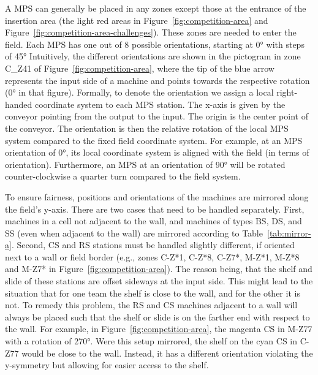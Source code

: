 \documentclass[12pt,twoside]{article}
\newcommand{\reffig}[1]{Figure~\ref{#1}}
\newcommand{\reftab}[1]{Table~\ref{#1}}
\begin{document}
A \ac{MPS} can generally  be placed in any zones except those at the
entrance of the insertion area (the light red areas in
\reffig{fig:competition-area} and \reffig{fig:competition-area-challenges}).
These zones are needed to enter the field. Each \ac{MPS} has one out of 8
possible orientations, starting at \ang{0} with steps of \ang{45}
Intuitively, the different orientations are shown in the pictogram in
zone C\_Z41 of \reffig{fig:competition-area}, where
the tip of the blue arrow represents the input side of a machine and points
towards the respective rotation (\ang{0} in that figure).
Formally, to denote
the orientation  we assign a local right-handed coordinate system to
each \ac{MPS} station. The x-axis is given by the conveyor pointing from
the output to the input. The origin is the center point of the
conveyor. The orientation is then the relative rotation of the local
\ac{MPS} system compared to the fixed field coordinate system. For example,
at an \ac{MPS} orientation of \ang{0}, its local coordinate system is
aligned with the field (in terms of orientation). Furthermore, an \ac{MPS}
at an orientation of \ang{90} will be rotated counter-clockwise a
quarter turn compared to the field system.

To ensure fairness, positions and orientations of the machines are mirrored
along the field's y-axis. There are two cases that need to be handled
separately. First, machines in a cell not adjacent to the wall, and machines of
types \ac{BS}, \ac{DS}, and \ac{SS} (even when adjacent to the wall) are
mirrored according to \reftab{tab:mirror-a}. Second, \ac{CS} and \ac{RS}
stations must be handled slightly different,
if oriented next to a wall or field border
(e.g., zones C-Z*1, C-Z*8, C-Z7*, M-Z*1, M-Z*8 and M-Z7* in
\reffig{fig:competition-area}).
The reason being, that the shelf and slide of these stations are
offset sideways at the input side. This might lead to the situation that for one
team the shelf is close to the wall, and for the other it is not. To remedy this
problem, the \ac{RS} and \ac{CS} machines adjacent to a wall will always
be placed such that the shelf or slide is on the farther end with respect
to the wall.
For example, in \reffig{fig:competition-area}, the magenta \ac{CS}
in M-Z77 with a rotation of \ang{270}. Were this setup mirrored, the shelf
on the cyan \ac{CS} in C-Z77 would be close to the wall.
Instead, it has a different orientation violating the y-symmetry
but allowing for easier access to the shelf.
\end{document}
